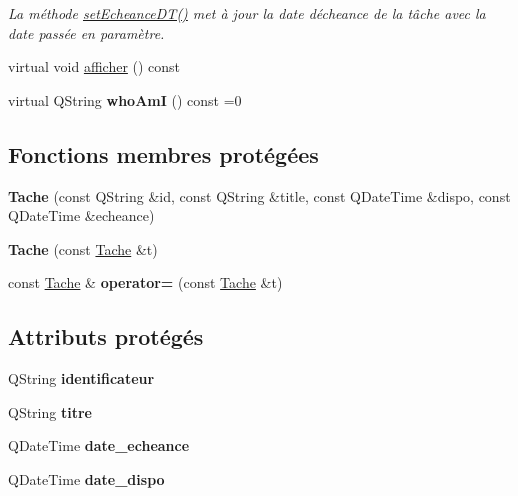 \begin{DoxyCompactItemize}
\begin{DoxyCompactList}\small\item\em La méthode \hyperlink{class_tache_add128bd3a8b4832f4e6f52e0ee80e16b}{set\+Echeance\+D\+T()} met à jour la date d\textquotesingle{}écheance de la tâche avec la date passée en paramètre. \end{DoxyCompactList}\item 
virtual void \hyperlink{class_tache_aa56e1690299f9b6892d21e10df7768b0}{afficher} () const 
\item 
\hypertarget{class_tache_acde59bde54ea8be7c5cbdca0267e7092}{}virtual Q\+String {\bfseries who\+Am\+I} () const =0\label{class_tache_acde59bde54ea8be7c5cbdca0267e7092}

\end{DoxyCompactItemize}
\subsection*{Fonctions membres protégées}
\begin{DoxyCompactItemize}
\item 
\hypertarget{class_tache_a5323cf9614ab261150a163937261c8b6}{}{\bfseries Tache} (const Q\+String \&id, const Q\+String \&title, const Q\+Date\+Time \&dispo, const Q\+Date\+Time \&echeance)\label{class_tache_a5323cf9614ab261150a163937261c8b6}

\item 
\hypertarget{class_tache_af154eeeb0bcfa9f8364025260d5f70b6}{}{\bfseries Tache} (const \hyperlink{class_tache}{Tache} \&t)\label{class_tache_af154eeeb0bcfa9f8364025260d5f70b6}

\item 
\hypertarget{class_tache_a481a4c75b9908ff79ef9dc9b8e957b51}{}const \hyperlink{class_tache}{Tache} \& {\bfseries operator=} (const \hyperlink{class_tache}{Tache} \&t)\label{class_tache_a481a4c75b9908ff79ef9dc9b8e957b51}

\end{DoxyCompactItemize}
\subsection*{Attributs protégés}
\begin{DoxyCompactItemize}
\item 
\hypertarget{class_tache_ae22f26aa33762082872376475946acff}{}Q\+String {\bfseries identificateur}\label{class_tache_ae22f26aa33762082872376475946acff}

\item 
\hypertarget{class_tache_a1d3d20046c0c4cc8482f71bb555b79cf}{}Q\+String {\bfseries titre}\label{class_tache_a1d3d20046c0c4cc8482f71bb555b79cf}

\item 
\hypertarget{class_tache_ad4d89bbfb2bd93ecf00e790ab792799d}{}Q\+Date\+Time {\bfseries date\+\_\+echeance}\label{class_tache_ad4d89bbfb2bd93ecf00e790ab792799d}

\item 
\hypertarget{class_tache_a6a892b5554571cabd823b1dae1ab270d}{}Q\+Date\+Time {\bfseries date\+\_\+dispo}\label{class_tache_a6a892b5554571cabd823b1dae1ab270d}

\end{DoxyCompactItemize}
